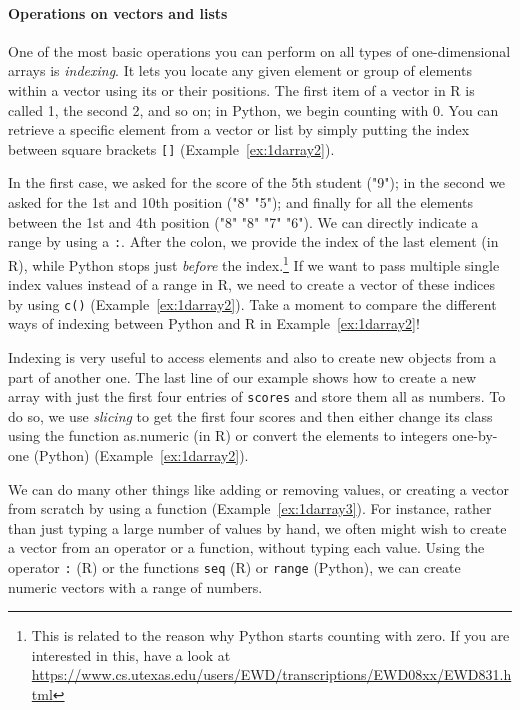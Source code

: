 \paragraph{Operations on vectors and lists}
One of the most
basic operations you can perform on all types of one-dimensional arrays
is \emph{indexing}. It lets you locate any given
element or group of elements within a vector using its or their
positions. The first item of a vector in R is called 1, the second 2, and so on;
in Python, we begin counting with 0.  You can retrieve a specific element
from a vector or list by simply putting the index between square brackets \verb|[]| (Example~\ref{ex:1darray2}).


In the first case, we asked for the score of the 5th student ("9");
in the second we asked for the 1st and 10th position ("8" "5"); and
finally for all the elements between the 1st and 4th position ("8"
"8" "7" "6"). We can directly indicate a range
by using a \verb|:|. After the colon, we provide the index of
the last element (in R), while Python stops just \emph{before} the index.\footnote{This is related to the
reason why Python starts counting with zero. If you are interested
in this, have a look at \url{https://www.cs.utexas.edu/users/EWD/transcriptions/EWD08xx/EWD831.html}}
If we want to pass multiple single index values instead of a range in R,
we need to create a vector of these indices by using \verb|c()| (Example~\ref{ex:1darray2}).
Take a moment to compare the different ways of indexing between Python
and R in Example~\ref{ex:1darray2}!

Indexing is very useful to access elements and also to
create new objects from a part of another one. The last line of our
example shows how to create a new array with just the first four
entries of \verb|scores| and store them all as numbers. To do so, we
use \emph{slicing} to get the first four scores and then either change its class using the function
as.numeric (in R) or convert the elements to integers one-by-one (Python)  (Example~\ref{ex:1darray2}).



We can do many other things like adding or removing values, or creating a vector from scratch by using a
function (Example~\ref{ex:1darray3}). For instance, rather than just typing  a large number of values by hand, we often might
wish to create a vector from an operator or a function, without typing
each value. Using the operator \index{:}\texttt{:} (R) or the functions \texttt{seq} (R) or \texttt{range} (Python), we 
can create numeric vectors with
a range of numbers.



